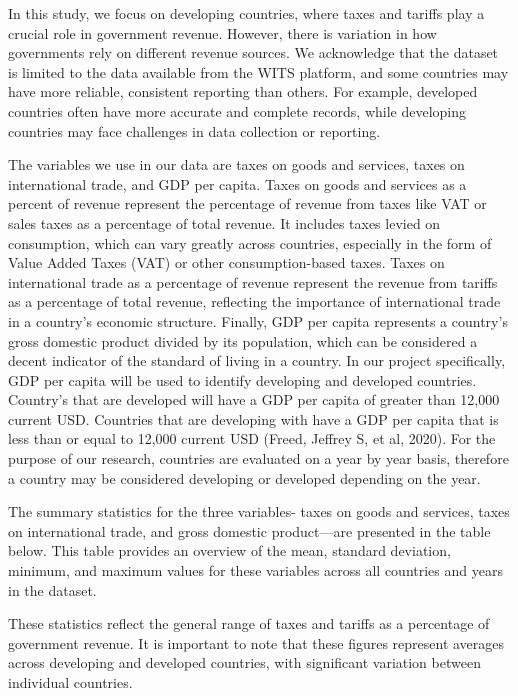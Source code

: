 \documentclass[12pt]{article}
\begin{document}
In this study, we focus on developing countries, where taxes and tariffs play a crucial role in government revenue. However, there is variation in how governments rely on different revenue sources. We acknowledge that the dataset is limited to the data available from the WITS platform, and some countries may have more reliable, consistent reporting than others. For example, developed countries often have more accurate and complete records, while developing countries may face challenges in data collection or reporting.

The variables we use in our data are taxes on goods and services, taxes on international trade, and GDP per capita. Taxes on goods and services as a percent of revenue represent the percentage of revenue from taxes like VAT or sales taxes as a percentage of total revenue. It includes taxes levied on consumption, which can vary greatly across countries, especially in the form of Value Added Taxes (VAT) or other consumption-based taxes. Taxes on international trade as a percentage of revenue represent the revenue from tariffs as a percentage of total revenue, reflecting the importance of international trade in a country's economic structure. Finally, GDP per capita represents a country's gross domestic product divided by its population, which can be considered a decent indicator of the standard of living in a country. In our project specifically, GDP per capita will be used to identify developing and developed countries. Country's that are developed will have a GDP per capita of greater than 12,000 current USD. Countries that are developing with have a GDP per capita that is less than or equal to 12,000 current USD (Freed, Jeffrey S, et al, 2020). For the purpose of our research, countries are evaluated on a year by year basis, therefore a country may be considered developing or developed depending on the year. 

The summary statistics for the three variables- taxes on goods and services, taxes on international trade, and gross domestic product—are presented in the table below. This table provides an overview of the mean, standard deviation, minimum, and maximum values for these variables across all countries and years in the dataset.



These statistics reflect the general range of taxes and tariffs as a percentage of government revenue. It is important to note that these figures represent averages across developing and developed countries, with significant variation between individual countries.
\end{document}
